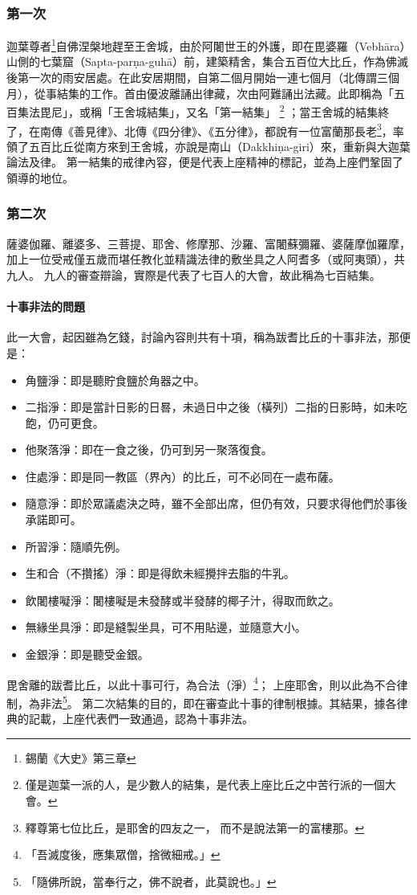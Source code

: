 \subsubsection{第一次}
  迦葉尊者\footnote{錫蘭《大史》第三章}自佛涅槃地趕至王舍城，由於阿闍世王的外護，即在毘婆羅（Vebhāra）山側的七葉窟（Sapta-parṇa-guhā）前，建築精舍，集合五百位大比丘，作為佛滅後第一次的雨安居處。在此安居期間，自第二個月開始一連七個月（北傳謂三個月），從事結集的工作。首由優波離誦出律藏，次由阿難誦出法藏。此即稱為「五百集法毘尼」，或稱「王舍城結集」，又名「第一結集」
  \footnote{僅是迦葉一派的人，是少數人的結集，是代表上座比丘之中苦行派的一個大會。}
  ；當王舍城的結集終了，在南傳《善見律》、北傳《四分律》、《五分律》，都說有一位富蘭那長老\footnote{釋尊第七位比丘，是耶舍的四友之一， 而不是說法第一的富樓那。}，率領了五百比丘從南方來到王舍城，亦說是南山（Dakkhiṇa-giri）來，重新與大迦葉論法及律。
  第一結集的戒律內容，便是代表上座精神的標記，並為上座們鞏固了領導的地位。
\subsubsection{第二次}
薩婆伽羅、離婆多、三菩提、耶舍、修摩那、沙羅、富闍蘇彌羅、婆薩摩伽羅摩，加上一位受戒僅五歲而堪任教化並精識法律的敷坐具之人阿耆多（或阿夷頭），共九人。
九人的審查辯論，實際是代表了七百人的大會，故此稱為七百結集。
\paragraph{十事非法的問題}
此一大會，起因雖為乞錢，討論內容則共有十項，稱為跋耆比丘的十事非法，那便是：
\begin{itemize}
  \item 角鹽淨：即是聽貯食鹽於角器之中。
  \item 二指淨：即是當計日影的日晷，未過日中之後（橫列）二指的日影時，如未吃飽，仍可更食。
  \item 他聚落淨：即在一食之後，仍可到另一聚落復食。
  \item 住處淨：即是同一教區（界內）的比丘，可不必同在一處布薩。
  \item 隨意淨：即於眾議處決之時，雖不全部出席，但仍有效，只要求得他們於事後承諾即可。
  \item 所習淨：隨順先例。
  \item 生和合（不攢搖）淨：即是得飲未經攪拌去脂的牛乳。
  \item 飲闍樓㘈淨：闍樓㘈是未發酵或半發酵的椰子汁，得取而飲之。
  \item 無緣坐具淨：即是縫製坐具，可不用貼邊，並隨意大小。
  \item 金銀淨：即是聽受金銀。
\end{itemize}
毘舍離的跋耆比丘，以此十事可行，為合法（淨）\footnote{「吾滅度後，應集眾僧，捨微細戒。」}；
上座耶舍，則以此為不合律制，為非法\footnote{「隨佛所說，當奉行之，佛不說者，此莫說也。」}。
第二次結集的目的，即在審查此十事的律制根據。其結果，據各律典的記載，上座代表們一致通過，認為十事非法。

